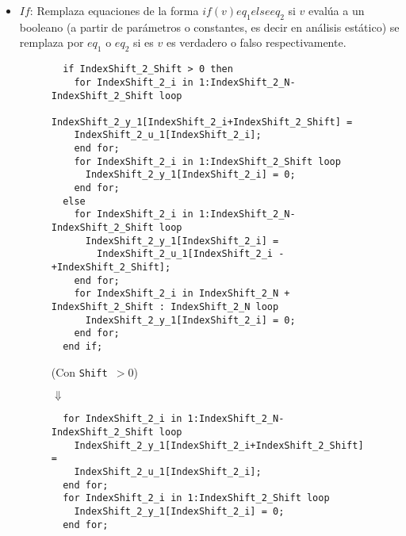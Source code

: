 \begin{itemize}
		\item $If$: Remplaza equaciones de la forma $if(v){eq_1}else{eq_2}$ si $v$ evalúa a un booleano (a partir de parámetros o constantes, 
			es decir en análisis estático) se remplaza por $eq_1$ o $eq_2$ si es $v$ es verdadero o falso respectivamente.

\begin{figure}[htp]
\centering
\begin{verbatim}
  if IndexShift_2_Shift > 0 then
    for IndexShift_2_i in 1:IndexShift_2_N-IndexShift_2_Shift loop
      IndexShift_2_y_1[IndexShift_2_i+IndexShift_2_Shift] = 
	IndexShift_2_u_1[IndexShift_2_i];
    end for;
    for IndexShift_2_i in 1:IndexShift_2_Shift loop
      IndexShift_2_y_1[IndexShift_2_i] = 0;
    end for;
  else
    for IndexShift_2_i in 1:IndexShift_2_N-IndexShift_2_Shift loop
      IndexShift_2_y_1[IndexShift_2_i] = 
		IndexShift_2_u_1[IndexShift_2_i - +IndexShift_2_Shift];
    end for;
    for IndexShift_2_i in IndexShift_2_N + IndexShift_2_Shift : IndexShift_2_N loop
      IndexShift_2_y_1[IndexShift_2_i] = 0;
    end for;
  end if;
\end{verbatim}

(Con \texttt{Shift $> 0$})

$\Downarrow$

\begin{verbatim}
  for IndexShift_2_i in 1:IndexShift_2_N-IndexShift_2_Shift loop
    IndexShift_2_y_1[IndexShift_2_i+IndexShift_2_Shift] = 
	IndexShift_2_u_1[IndexShift_2_i];
  end for;
  for IndexShift_2_i in 1:IndexShift_2_Shift loop
    IndexShift_2_y_1[IndexShift_2_i] = 0;
  end for;
\end{verbatim}
\end{figure}
	  \end{itemize}
